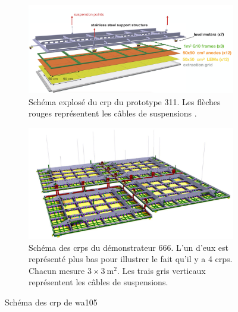             \begin{figure}[htbp]
                \begin{subfigure}[b]{\textwidth}
                    \begin{center}\includegraphics[width=\textwidth,keepaspectratio]{Chapitre_3/pictures/crp_311.png}\end{center}
                    \caption[\gls{crp} du prototype 311]{Schéma explosé du \gls{crp} du prototype 311. Les flèches rouges représentent les câbles de suspensions \cite{311paper2018}.}
                    \label{fig::crp_311}
                \end{subfigure}
                \begin{subfigure}[b]{\textwidth}
                    \begin{center}\includegraphics[width=\textwidth,keepaspectratio]{Chapitre_3/pictures/crp_666.png}\end{center}
                    \caption[\glspl{crp} du démonstrateur 666]{Schéma des \glspl{crp} du démonstrateur 666. L'un d'eux est représenté plus bas pour illustrer le fait qu'il y a 4 \glspl{crp}. Chacun mesure $3\times\SI{3}{\meter\squared}$. Les trais gris verticaux représentent les câbles de suspensions. \cite{talk_crp_lapp}}
                    \label{fig::crp_666}
                \end{subfigure}
                \caption{Schéma des \gls{crp} de \gls{wa105}}
            \end{figure}
        
